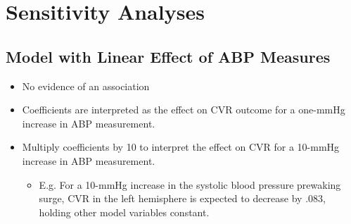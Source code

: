 \documentclass[10pt]{article}\usepackage[]{graphicx}\usepackage[]{color}
\begin{document}
\clearpage
\section{Sensitivity Analyses}

\subsection{Model with Linear Effect of ABP Measures}

\begin{itemize}
  \item No evidence of an association
  \item Coefficients are interpreted as the effect on CVR outcome for a one-mmHg increase in ABP measurement. 
  \item Multiply coefficients by 10 to interpret the effect on CVR for a 10-mmHg increase in ABP measurement.
  \begin{itemize}
    \item E.g. For a 10-mmHg increase in the systolic blood pressure prewaking surge, CVR in the left hemisphere is expected to decrease by .083, holding other model variables constant. 
  \end{itemize}
\end{itemize}
\end{document}
